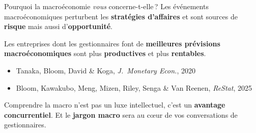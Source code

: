 \documentclass[aspectratio=169]{beamer}
\begin{document}
\begin{frame}[t]{Pourquoi la macroéconomie \textit{vous} concerne-t-elle\,?}
   \small
   Les événements macroéconomiques perturbent les \textbf{stratégies d'affaires} et sont sources de \textbf{risque} mais aussi d'\textbf{opportunité}. \\ \vspace{0.25cm}

   Les entreprises dont les gestionnaires font de \textbf{meilleures prévisions macroéconomiques} sont plus \textbf{productives} et plus \textbf{rentables}.
   \vspace{0.1cm}
   \begin{itemize}
      \footnotesize
      \setlength\itemsep{0.1cm}
      \item[\textcolor{HECgray}{$\bullet$}] {\color{HECgray} Tanaka, Bloom, David \& Koga, \textit{J.\ Monetary Econ.}, 2020}
      \item[\textcolor{HECgray}{$\bullet$}] {\color{HECgray} Bloom, Kawakubo, Meng, Mizen, Riley, Senga \& Van Reenen, \textit{ReStat}, 2025}
   \end{itemize}
   \vspace{0.15cm}
   \begin{bizimplication}
      Comprendre la macro n'est pas un luxe intellectuel, c'est un \textbf{avantage concurrentiel}. Et le \textbf{jargon macro} sera au c\oe ur de vos conversations de gestionnaires.
   \end{bizimplication}
\end{frame}
\end{document}
